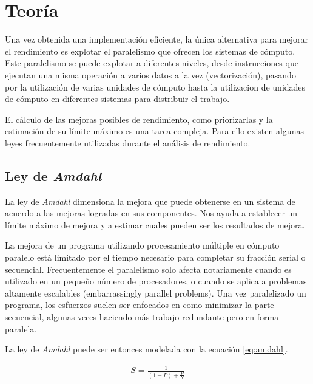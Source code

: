\documentclass[a4paper]{report}
\begin{document}
\section{Teor\'ia}

Una vez obtenida una implementaci\'on eficiente, la \'unica alternativa para mejorar el rendimiento es explotar el paralelismo que
ofrecen los sistemas de c\'omputo. Este paralelismo se puede explotar a diferentes niveles, desde instrucciones que ejecutan una misma operaci\'on a varios
datos a la vez (vectorizaci\'on), pasando por la utilizaci\'on de varias unidades de c\'omputo hasta la utilizacion de unidades de c\'omputo en diferentes sistemas para distribuir el trabajo.

\bigskip

El c\'alculo de las mejoras posibles de rendimiento, como priorizarlas y la estimaci\'on de su l\'imite m\'aximo es una tarea compleja.
Para ello existen algunas leyes frecuentemente utilizadas durante el an\'alisis de rendimiento.

\subsection{Ley de {\it Amdahl}}

 La ley de {\it Amdahl} \cite{amdahl} dimensiona la mejora que puede obtenerse en un sistema de acuerdo a las mejoras logradas en sus
componentes. Nos ayuda a establecer un l\'imite m\'aximo de mejora y a estimar cuales pueden ser los resultados de mejora.

\bigskip

La mejora de un programa utilizando procesamiento m\'ultiple en c\'omputo paralelo
est\'a limitado por el tiempo necesario para completar su fracci\'on serial o
secuencial. Frecuentemente el paralelismo solo afecta notariamente cuando es
utilizado en un peque\~no n\'umero de procesadores, o cuando se aplica a problemas
altamente escalables (embarrassingly parallel problems). Una vez paralelizado un
programa, los esfuerzos suelen ser enfocados en como minimizar
la parte secuencial, algunas veces haciendo m\'as trabajo redundante pero en forma paralela.

\bigskip

La ley de {\it Amdahl} puede ser entonces modelada con la ecuaci\'on \ref{eq:amdahl}.

\begin{eqnarray}
\label{eq:amdahl}
S = \frac{1}{(1-P) + \frac{P}{N}}
\end{eqnarray}
\end{document}
